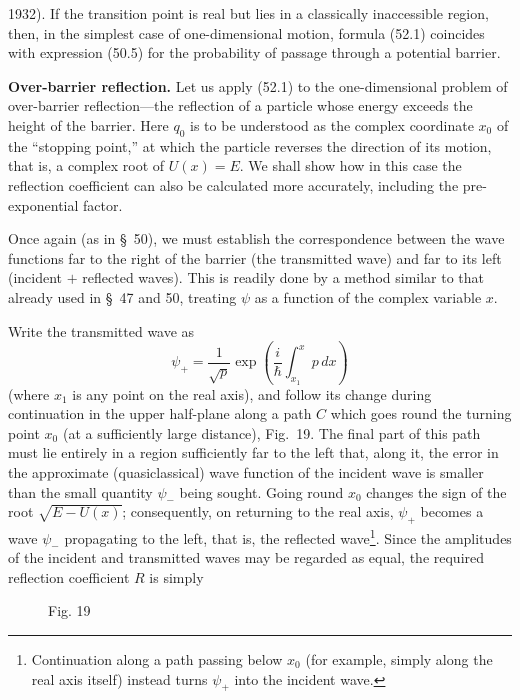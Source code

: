 1932). If the transition point is real but lies in a classically inaccessible
region, then, in the simplest case of one-dimensional motion, formula (52.1)
coincides with expression (50.5) for the probability of passage through a
potential barrier.

\textbf{Over-barrier reflection.} Let us apply (52.1) to the one-dimensional
problem of over-barrier reflection---the reflection of a particle whose energy
exceeds the height of the barrier. Here $q_0$ is to be understood as the
complex coordinate $x_0$ of the ``stopping point,'' at which the particle
reverses the direction of its motion, that is, a complex root of
$U(x)=E$. We shall show how in this case the reflection coefficient can also
be calculated more accurately, including the pre-exponential factor.

Once again (as in \S~50), we must establish the correspondence between the
wave functions far to the right of the barrier (the transmitted wave) and far
to its left (incident $+$ reflected waves). This is readily done by a method
similar to that already used in \S~47 and 50, treating $\psi$ as a function of
the complex variable $x$.

Write the transmitted wave as
\[
 \psi_+=\frac1{\sqrt p}\exp\left(\frac i\hbar\int_{x_1}^x p\,dx\right)
\]
(where $x_1$ is any point on the real axis), and follow its change during
continuation in the upper half-plane along a path $C$ which goes round the
turning point $x_0$ (at a sufficiently large distance), Fig.~19. The final
part of this path must lie entirely in a region sufficiently far to the left
that, along it, the error in the approximate (quasiclassical) wave function of
the incident wave is smaller than the small quantity $\psi_-$ being sought.
Going round $x_0$ changes the sign of the root $\sqrt{E-U(x)}$; consequently,
on returning to the real axis, $\psi_+$ becomes a wave $\psi_-$ propagating to
the left, that is, the reflected wave\footnote{Continuation along a path
passing below $x_0$ (for example, simply along the real axis itself) instead
turns $\psi_+$ into the incident wave.}. Since the amplitudes of the incident
and transmitted waves may be regarded as equal, the required reflection
coefficient $R$ is simply

\begin{figure}[ht]
\centering
{}
\par\smallskip Fig. 19
\end{figure}

